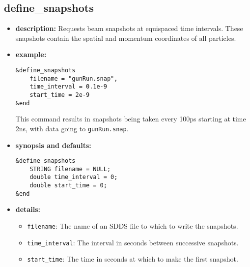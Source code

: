 %
\newpage

\subsection{define\_snapshots}

\begin{itemize}

\item {\bf description:}
Requests beam snapshots at equispaced time intervals.
These snapshots contain the spatial and momentum coordinates
of all particles.

\item {\bf example:} 
\begin{verbatim}
&define_snapshots
    filename = "gunRun.snap",
    time_interval = 0.1e-9
    start_time = 2e-9
&end
\end{verbatim}
This command results in snapshots being taken every 100ps starting
at time 2ns, with data going to {\tt gunRun.snap}.

\item {\bf synopsis and defaults:} 
\begin{verbatim}
&define_snapshots
    STRING filename = NULL;
    double time_interval = 0;
    double start_time = 0;
&end
\end{verbatim}

\item {\bf details:} 
\begin{itemize}
    \item {\tt filename}:  The name of an SDDS file to which to write the snapshots.
    \item {\tt time\_interval}:  The interval in seconds between successive snapshots.
    \item {\tt start\_time}: The time in seconds at which to make the first snapshot.
\end{itemize}

\end{itemize}
